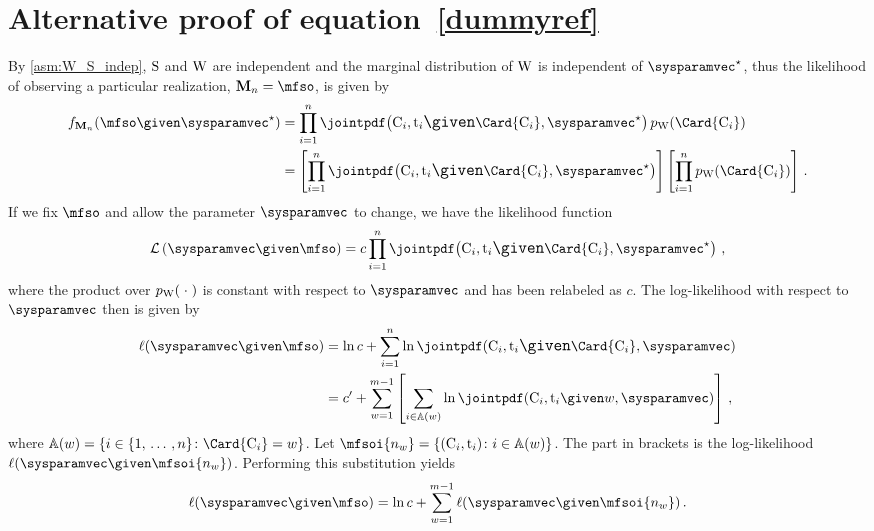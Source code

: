 \documentclass[../main.tex]{subfiles}
\begin{document}
\chapter{Alternative proof of equation~\ref{dummyref}}
By \cref{asm:W_S_indep}, $\mathrm{S}$ and $\mathrm{W}$ are independent and the marginal distribution of $\mathrm{W}$ is independent of $\tparam\sysparamvec$, thus the likelihood of observing a particular realization, $\mfs = \mfso$, is given by
\begin{equation}
\begin{split}
    \pdf_{\mfs}(\mfso \given \tparam{\sysparamvec})
        &= \prod_{i=1}^{n} \jointpdf\!\left(\cand_i, \ti_i \mathlarger{\given} \Card{\cand_i}, \tparam\sysparamvec\right) \pmf_{\RV{W}}\!\left(\Card{\cand_i}\right)\\
        &= \left[\prod_{i=1}^{n} \jointpdf\!\left(\cand_i, \ti_i \mathlarger{\given} \Card{\cand_i}, \tparam\sysparamvec\right)\right]\left[\prod_{i=1}^{n} \pmf_{\RV{W}}\!\left(\Card{\cand_i}\right)\right]\,.
\end{split}
\end{equation}
If we fix $\mfso$ and allow the parameter $\sysparamvec$ to change, we have the likelihood function
\begin{equation}
    \likelihood\left(\sysparamvec \given \mfso\right) = c \prod_{i=1}^{n} \jointpdf\!\left(\cand_i, \ti_i \mathlarger{\given} \Card{\cand_i}, \tparam\sysparamvec\right)\,,
\end{equation}
where the product over $p_{\mathrm{W}}(\;\cdot\;)$ is constant with respect to $\sysparamvec$ and has been relabeled as $c$. The log-likelihood with respect to $\sysparamvec$ then is given by
\begin{equation}
\begin{split}
    \ell(\sysparamvec \given \mfso)
        &= \ln c + \sum_{i=1}^{n} \ln \jointpdf(\cand_i,\ti_i \mathlarger{\given} \Card{\cand_i}, \sysparamvec)\\
        &= c' + \sum_{w=1}^{m-1} \left[\sum_{i \in \mathbb{A}(w)}\ln \jointpdf(\cand_i,\ti_i \given w, \sysparamvec)\right]\,,
\end{split}
\end{equation}
where $\mathbb{A}(w) = \{i \in \{1,\,\ldots\,,n\} \colon \Card{\cand_i} = w\}$. Let $\mfsoi{n_w} = \{(\cand_i, \ti_i) \colon i \in \mathbb{A}(w)\}$. The part in brackets is the log-likelihood $\ell(\sysparamvec \given \mfsoi{n_w})$. Performing this substitution yields
\begin{equation}
    \ell(\sysparamvec \given \mfso) = \ln c + \sum_{w=1}^{m-1} \ell(\sysparamvec \given \mfsoi{n_w})\,.
\end{equation}
\end{document}

